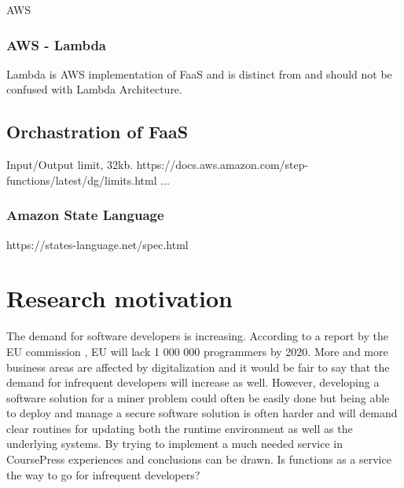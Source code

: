 AWS

\subsubsection{AWS - Lambda}


Lambda is AWS implementation of FaaS and is distinct from and should not be confused with Lambda Architecture\cite{Astakhov2015}. 

\subsection{Orchastration of FaaS}

Input/Output limit, 32kb. https://docs.aws.amazon.com/step-functions/latest/dg/limits.html
...

\subsubsection{Amazon State Language}
https://states-language.net/spec.html

\section{Research motivation}



The demand for software developers is increasing. According to a report by the EU commission \cite{}, EU will lack 1 000 000 programmers by 2020. More and more business areas are affected by digitalization \cite{} and it would be fair to say that the demand for infrequent developers will increase as well. 
However, developing a software solution for a miner problem could often be easily done but being able to deploy and manage a secure software solution is often harder and will demand clear routines for updating both the runtime environment as well as the underlying systems. By trying to implement a much needed service in CoursePress experiences and conclusions can be drawn. Is functions as a service the way to go for infrequent developers? 


